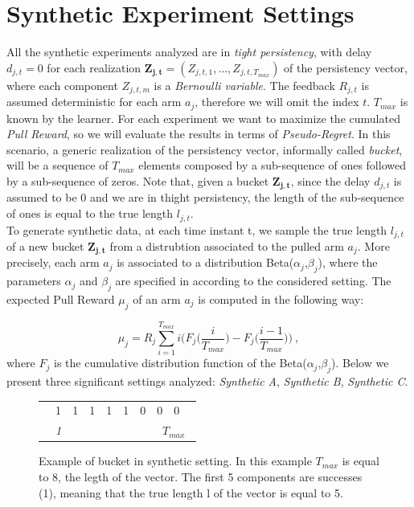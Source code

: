 \section{Synthetic Experiment Settings}
All the synthetic experiments analyzed are in \emph{tight persistency}, with delay $d_{j,t}=0$ for each realization $\boldsymbol{Z_{j,t}} = (Z_{j,t,1},\dots,Z_{j,t,T_{max}})$ of the persistency vector, where each component $Z_{j,t,m}$ is a \emph{Bernoulli variable}. The feedback $R_{j, t}$ is assumed deterministic for each arm $a_j$, therefore we will omit the index $t$. $T_{max}$ is known by the learner. For each experiment we want to maximize the cumulated \emph{Pull Reward}, so we will evaluate the results in terms of \emph{Pseudo-Regret}. In this scenario, a generic realization of the persistency vector, informally called \emph{bucket}, will be a sequence of $T_{max}$ elements composed by a sub-sequence of ones followed by a sub-sequence of zeros. Note that, given a bucket $\boldsymbol{Z_{j,t}}$, since the delay $d_{j,t}$ is assumed to be 0 and we are in thight persistency, the length of the sub-sequence of ones is equal to the true length $l_{j,t}$.\\
To generate synthetic data, at each time instant t, we sample the true length $l_{j,t}$ of a new bucket $\boldsymbol{Z_{j,t}}$ from a distrubtion associated to the pulled arm $a_j$. More precisely, each arm $a_j$ is associated to a distribution Beta($\alpha_j$,$\beta_j$), where the parameters $\alpha_j$ and $\beta_j$ are specified in according to the considered setting. The expected Pull Reward $\mu_j$ of an arm $a_j$ is computed in the following way:

$$\mu_j = R_j\sum_{i=1}^{T_{max}}i\bigg(F_j\bigg(\frac{i}{T_{max}}\bigg)-F_j\bigg(\frac{i-1}{T_{max}}\bigg)\bigg) \ ,$$
where $F_j$ is the cumulative distribution function of the Beta($\alpha_j$,$\beta_j$).
Below we present three significant settings analyzed: \emph{Synthetic A}, \emph{Synthetic B}, \emph{Synthetic C}.

\begin{figure}[t]
	\centering
	\begin{tabular}{llllllllll}
		\cline{2-9}
		\multicolumn{1}{l|}{} & \multicolumn{1}{l|}{1} & \multicolumn{1}{l|}{1} & \multicolumn{1}{l|}{1} & \multicolumn{1}{l|}{1} & \multicolumn{1}{l|}{1} & \multicolumn{1}{l|}{0} & \multicolumn{1}{l|}{0} & \multicolumn{1}{l|}{0} &  \\ \cline{2-9}
		& \textit{1}             & \textit{}              &                        &                        &                        &                        & \multicolumn{3}{c}{\textit{ $T_{max}$}}                 
	\end{tabular}
	\caption{Example of bucket in synthetic setting. In this example $T_{max}$ is equal to 8, the legth of the vector. The first 5 components are successes (1), meaning that the true length l of the vector is equal to 5.}
\end{figure}
